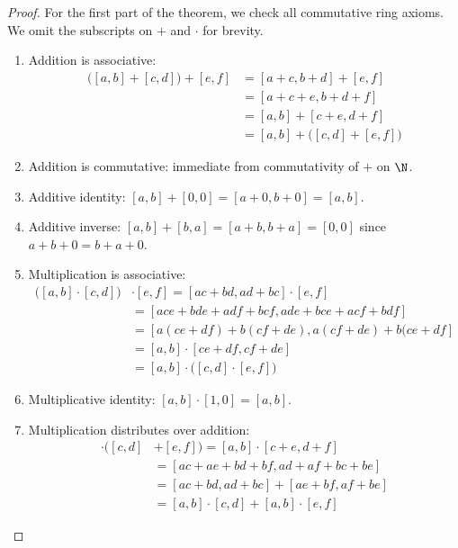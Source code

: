 \begin{proof}
    For the first part of the theorem, we check all commutative ring axioms.
    We omit the subscripts on $+$ and $\cdot$ for brevity.
    \begin{enumerate}[label=\small(R\arabic*)]
        \item Addition is associative: \begin{align*}
            \big([a, b] + [c, d]\big) + [e, f]
                &= [a + c, b + d] + [e, f] \\
                &= [a + c + e, b + d + f] \\
                &= [a, b] + [c + e, d + f] \\
                &= [a, b] + \big([c, d] + [e, f]\big)
        \end{align*}
        \item Addition is commutative: immediate from commutativity of $+$ on
        $\N$.
        \item Additive identity: $[a, b] + [0, 0] = [a + 0, b + 0] =
        [a, b]$.
        \item Additive inverse: $[a, b] + [b, a] = [a + b, b + a] =
        [0, 0]$ since $a + b + 0 = b + a + 0$.
        \item Multiplication is associative: \begin{align*}
            \big([a, b] \cdot [c, d]\big) &\cdot [e, f]
                = [ac + bd, ad + bc] \cdot [e, f] \\
                &= [ace + bde + adf + bcf, ade + bce + acf + bdf] \\
                &= [a(ce + df) + b(cf + de), a(cf + de) + b(ce + df] \\
                &= [a, b] \cdot [ce + df, cf + de] \\
                &= [a, b] \cdot \big([c, d] \cdot [e, f]\big)
        \end{align*}
        \item Multiplicative identity: $[a, b] \cdot [1, 0] = [a, b]$.
        \item Multiplication distributes over addition: \begin{align*}
            [a, b] \cdot \big([c, d] &+ [e, f]\big)
                = [a, b] \cdot [c + e, d + f] \\
                &= [ac + ae + bd + bf, ad + af + bc + be] \\
                &= [ac + bd, ad + bc] + [ae + bf, af + be] \\
                &= [a, b] \cdot [c, d] + [a, b] \cdot [e, f]

\end{align*}
\end{enumerate}
\end{proof}
